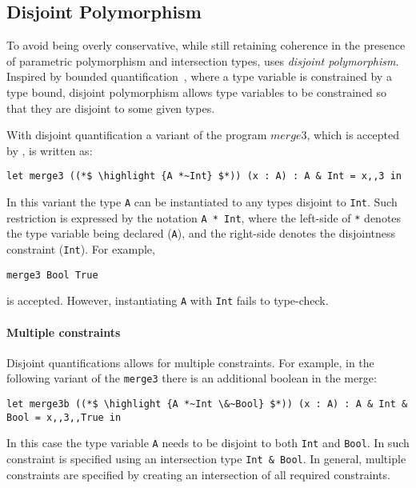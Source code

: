 \subsection{Disjoint Polymorphism}\label{subsec:disjoint-quantification}
To avoid being overly conservative, while still retaining coherence in the
presence of parametric polymorphism and intersection types, \name uses
\emph{disjoint polymorphism}.
Inspired by bounded quantification~\cite{Cardelli:1994},
where a type variable is constrained by a type bound, disjoint polymorphism 
allows type variables to be constrained so that they are disjoint to some
given types. 

With disjoint quantification a variant of the program $merge3$, which
is accepted by \name, is written as:

\begin{lstlisting}
let merge3 ((*$ \highlight {A *~Int} $*)) (x : A) : A & Int = x,,3 in
\end{lstlisting}

\noindent In this variant the type \lstinline{A} can be instantiated
to any types disjoint to \lstinline{Int}. Such restriction is
expressed by the notation \lstinline{A * Int}, where the left-side of 
\lstinline{*} denotes the type variable being declared (\lstinline{A}), and the
right-side denotes the disjointness constraint (\lstinline{Int}).
For example, 

\begin{lstlisting}
merge3 Bool True
\end{lstlisting}

\noindent is accepted. However, instantiating \lstinline{A} with
\lstinline{Int} fails to type-check. 

\paragraph{Multiple constraints} Disjoint quantifications allows for
multiple constraints. For example, in the following variant of the
\lstinline{merge3} there is an additional boolean in the merge:

\begin{lstlisting}
let merge3b ((*$ \highlight {A *~Int \&~Bool} $*)) (x : A) : A & Int & Bool = x,,3,,True in
\end{lstlisting}

\noindent In this case the type variable \lstinline{A} needs to be
disjoint to both \lstinline{Int} and \lstinline{Bool}. In \name
such constraint is specified using an intersection type
\lstinline{Int & Bool}. In general, multiple constraints are specified 
by creating an intersection of all required constraints. 

